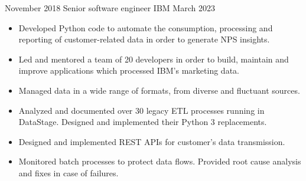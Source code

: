 \begin{experiences}
    \experience
        {November 2018}
        {Senior software engineer}
        {IBM}
        {March 2023}
        {
            \begin{itemize}
                \item Developed Python code to automate the
                    consumption, processing and reporting of customer-related data in order to generate NPS insights.
                \item Led and mentored a team of 20 developers in order to build, maintain and improve
                    applications which processed IBM's marketing data.
                \item Managed data in a wide range of formats, from diverse and fluctuant sources.
                \item Analyzed and documented over 30 legacy ETL processes running in DataStage. Designed
                      and implemented their Python 3 replacements.
                \item Designed and implemented REST APIs for customer's data transmission.
                \item Monitored batch processes to protect data flows. Provided root cause analysis and
                      fixes in case of failures.

\end{itemize}}
\end{experiences}
